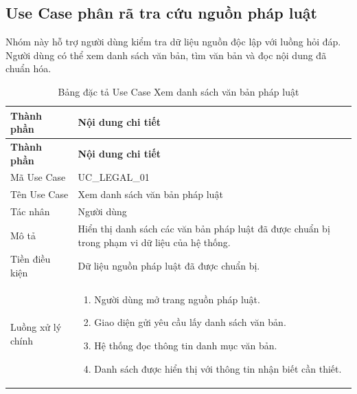 \documentclass[12pt,a4paper,oneside]{report}
\begin{document}
\subsection{Use Case phân rã tra cứu nguồn pháp luật}
Nhóm này hỗ trợ người dùng kiểm tra dữ liệu nguồn độc lập với luồng hỏi đáp. Người dùng có thể xem danh sách văn bản, tìm văn bản và đọc nội dung đã chuẩn hóa.
{
  \begin{longtable}{|L{3.6cm}|L{11.2cm}|}
    \caption{Bảng đặc tả Use Case Xem danh sách văn bản pháp luật}\label{tab:uc-legal-list}                           \\
    \hline
    \textbf{Thành phần} & \textbf{Nội dung chi tiết}                                                                    \\
    \hline
    \endfirsthead
    \hline
    \textbf{Thành phần} & \textbf{Nội dung chi tiết}                                                                    \\
    \hline
    \endhead
    Mã Use Case       & UC\_LEGAL\_01                                                                                 \\
    \hline
    Tên Use Case      & Xem danh sách văn bản pháp luật                                                               \\
    \hline
    Tác nhân            & Người dùng                                                                                    \\
    \hline
    Mô tả               & Hiển thị danh sách các văn bản pháp luật đã được chuẩn bị trong phạm vi dữ liệu của hệ thống. \\
    \hline
    Tiền điều kiện      & Dữ liệu nguồn pháp luật đã được chuẩn bị.                                                     \\
    \hline
    Luồng xử lý chính   & \begin{enumerate}[leftmargin=*,nosep]
                            \item Người dùng mở trang nguồn pháp luật.
                            \item Giao diện gửi yêu cầu lấy danh sách văn bản.
                            \item Hệ thống đọc thông tin danh mục văn bản.
                            \item Danh sách được hiển thị với thông tin nhận biết cần thiết.

\end{enumerate}
\end{longtable}}
\end{document}

